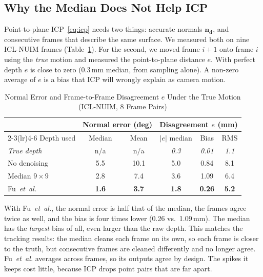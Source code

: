 \documentclass[conference]{IEEEtran}
\newcommand{\fu}{Fu~\emph{et~al.}}
\begin{document}
\subsection{Why the Median Does Not Help ICP}

Point-to-plane ICP~\eqref{eq:icp} needs two things: accurate normals
$\mathbf{n_d}$, and consecutive frames that describe the same surface. We
measured both on nine ICL-NUIM frames (Table~\ref{tab:normals}). For the
second, we moved frame $i+1$ onto frame $i$ using the \emph{true} motion and
measured the point-to-plane distance $e$. With perfect depth $e$ is close to
zero (0.3\,mm median, from sampling alone). A non-zero average of $e$ is a
bias that ICP will wrongly explain as camera motion.

\begin{table}[!t]
\caption{Normal Error and Frame-to-Frame Disagreement $e$ Under the True Motion (ICL-NUIM, 8 Frame Pairs)}
\label{tab:normals}
\centering
\small
\setlength{\tabcolsep}{4pt}
\begin{tabular}{@{}lccccc@{}}
\toprule
& \multicolumn{2}{c}{Normal error (deg)} & \multicolumn{3}{c}{Disagreement $e$ (mm)}\\
\cmidrule(lr){2-3}\cmidrule(lr){4-6}
Depth used & Median & Mean & $|e|$ median & Bias & RMS\\
\midrule
\emph{True depth} & n/a & n/a & \emph{0.3} & \emph{0.01} & \emph{1.1}\\
No denoising & 5.5 & 10.1 & 5.0 & 0.84 & 8.1\\
Median $9\times9$ & 2.8 & 7.4 & 3.6 & 1.09 & 6.4\\
\fu{} & \textbf{1.6} & \textbf{3.7} & \textbf{1.8} & \textbf{0.26} & \textbf{5.2}\\
\bottomrule
\end{tabular}
\end{table}

With \fu{}, the normal error is half that of the median, the frames agree
twice as well, and the bias is four times lower (0.26 vs.\ 1.09\,mm). The
median has the \emph{largest} bias of all, even larger than the raw depth.
This matches the tracking results: the median cleans each frame on its own, so
each frame is closer to the truth, but consecutive frames are cleaned
differently and no longer agree. \fu{} averages across frames, so its outputs
agree by design. The spikes it keeps cost little, because ICP drops point
pairs that are far apart.

\end{document}
